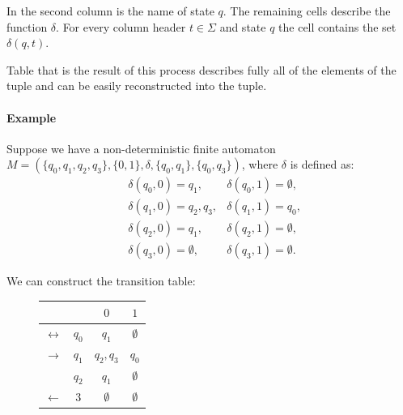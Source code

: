 \documentclass{ctuthesis}
\begin{document}

In the second column is the name of state $q$. The remaining cells describe the function $\delta$. For every column header $t \in \Sigma$ and state $q$ the cell contains the set $\delta(q, t)$. 

Table that is the result of this process describes fully all of the elements of the tuple and can be easily reconstructed into the tuple.

\paragraph{Example}
Suppose we have a non-deterministic finite automaton $M = (\{q_0, q_1, q_2, q_3\}, \{0,1\}, \delta, \{q_0, q_1\}, \{q_0, q_3\})$, where $\delta$ is defined as:
\begin{align*}
	&\delta(q_0, 0) = {q_1}, &\delta(q_0, 1) = \emptyset, \\
	&\delta(q_1, 0) = {q_2, q_3}, &\delta(q_1, 1) = {q_0}, \\
	&\delta(q_2, 0) = {q_1}, &\delta(q_2, 1) = \emptyset, \\
	&\delta(q_3, 0) = \emptyset, &\delta(q_3, 1) = \emptyset. 
\end{align*}

We can construct the transition table:

\begin{figure}[H]
\begin{ctucolortab}
\begin{tabular}{cc|cc}
	&&$0$ & $1$ \\\hline
	$\leftrightarrow$ & $q_0$ & $q_1$ & $\emptyset$ \\
	$\rightarrow$ & $q_1$ & $q_2,q_3$ & $q_0$ \\
	& $q_2$ & $q_1$ & $\emptyset$ \\
	$\leftarrow$ & $3$ & $\emptyset$ & $\emptyset$
\end{tabular}
\end{ctucolortab}
\end{figure}
\end{document}
